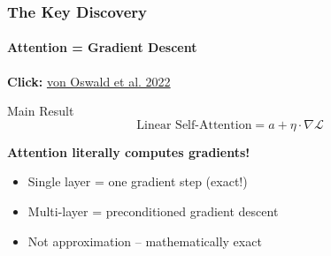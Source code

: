 \documentclass[10pt,aspectratio=169]{beamer}
\begin{document}
\begin{frame}
\frametitle{The Key Discovery}
\framesubtitle{Attention = Gradient Descent}

\begin{center}
\Large
\textbf{Click:} \href{run:./papers/2212.07677_transformers_gradient_descent.pdf}{\color{blue}von Oswald et al. 2022}
\end{center}

\vspace{0.5cm}

\begin{block}{Main Result}
\Large
\begin{equation*}
\text{Linear Self-Attention} = a + \eta \cdot \nabla \mathcal{L}
\end{equation*}
\end{block}

\vspace{0.5cm}
\textbf{Attention literally computes gradients!}

\begin{itemize}
    \item Single layer = one gradient step (exact!)
    \item Multi-layer = preconditioned gradient descent
    \item Not approximation -- mathematically exact
\end{itemize}
\end{frame}

\end{document}
